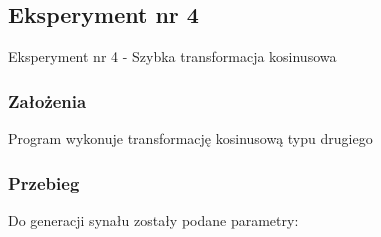 \documentclass[12pt]{article}
\begin{document}

\subsection{Eksperyment nr 4}

Eksperyment nr 4  - Szybka transformacja kosinusowa
\subsubsection{Założenia}
Program wykonuje transformację kosinusową typu drugiego

\subsubsection{Przebieg}
Do generacji synału zostały podane parametry:
\end{document}
